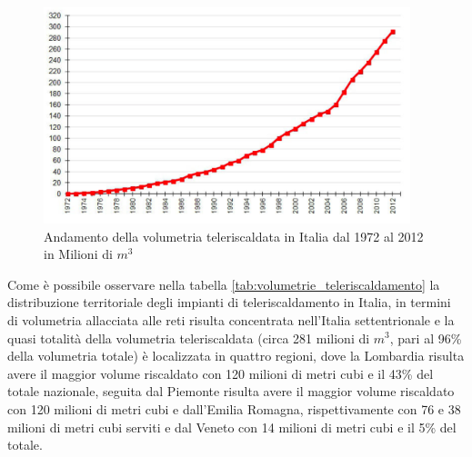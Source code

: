\documentclass[laurea,oneside,11pt]{USiena_tesiLM}
\begin{document}
\begin{figure}[!ht]
\centering
\includegraphics[width=0.95\textwidth]{figure/volumetria_teleriscaldata} 
\caption{Andamento della volumetria teleriscaldata in Italia dal 1972 al 2012 in Milioni di $m^3$}
\label{fig:volumetria_teleriscaldata}
\end{figure}

Come è possibile osservare nella tabella \ref{tab:volumetrie_teleriscaldamento} la distribuzione territoriale degli impianti di teleriscaldamento in Italia, in termini di volumetria allacciata alle reti risulta concentrata nell'Italia settentrionale e la quasi totalità della volumetria teleriscaldata (circa 281 milioni di $m^3$, pari al 96\% della volumetria totale) è localizzata in quattro regioni, dove la Lombardia risulta avere il maggior volume riscaldato con 120 milioni di metri cubi e il 43\% del totale nazionale, seguita dal Piemonte risulta avere il maggior volume riscaldato con 120 milioni di metri cubi e dall'Emilia Romagna, rispettivamente con 76 e 38 milioni di metri cubi serviti e dal Veneto con 14 milioni di metri cubi e il 5\% del totale.
\end{document}
